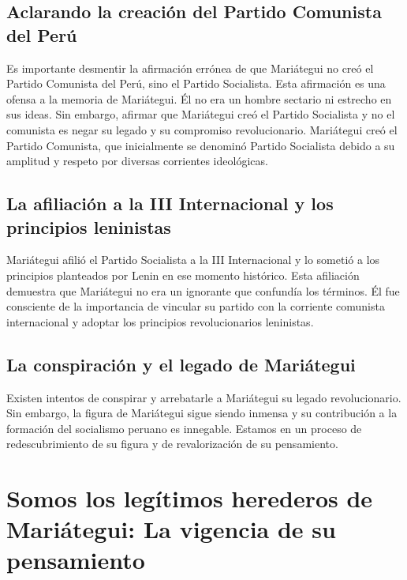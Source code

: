\documentclass[
  a4paper,
]{article}
\begin{document}
\hypertarget{aclarando-la-creaciuxf3n-del-partido-comunista-del-peruxfa}{%
\subsection{Aclarando la creación del Partido Comunista del
Perú}\label{aclarando-la-creaciuxf3n-del-partido-comunista-del-peruxfa}}

Es importante desmentir la afirmación errónea de que Mariátegui no creó
el Partido Comunista del Perú, sino el Partido Socialista. Esta
afirmación es una ofensa a la memoria de Mariátegui. Él no era un hombre
sectario ni estrecho en sus ideas. Sin embargo, afirmar que Mariátegui
creó el Partido Socialista y no el comunista es negar su legado y su
compromiso revolucionario. Mariátegui creó el Partido Comunista, que
inicialmente se denominó Partido Socialista debido a su amplitud y
respeto por diversas corrientes ideológicas.

\hypertarget{la-afiliaciuxf3n-a-la-iii-internacional-y-los-principios-leninistas}{%
\subsection{La afiliación a la III Internacional y los principios
leninistas}\label{la-afiliaciuxf3n-a-la-iii-internacional-y-los-principios-leninistas}}

Mariátegui afilió el Partido Socialista a la III Internacional y lo
sometió a los principios planteados por Lenin en ese momento histórico.
Esta afiliación demuestra que Mariátegui no era un ignorante que
confundía los términos. Él fue consciente de la importancia de vincular
su partido con la corriente comunista internacional y adoptar los
principios revolucionarios leninistas.

\hypertarget{la-conspiraciuxf3n-y-el-legado-de-mariuxe1tegui}{%
\subsection{La conspiración y el legado de
Mariátegui}\label{la-conspiraciuxf3n-y-el-legado-de-mariuxe1tegui}}

Existen intentos de conspirar y arrebatarle a Mariátegui su legado
revolucionario. Sin embargo, la figura de Mariátegui sigue siendo
inmensa y su contribución a la formación del socialismo peruano es
innegable. Estamos en un proceso de redescubrimiento de su figura y de
revalorización de su pensamiento.

\hypertarget{somos-los-leguxedtimos-herederos-de-mariuxe1tegui-la-vigencia-de-su-pensamiento}{%
\section{Somos los legítimos herederos de Mariátegui: La vigencia de su
pensamiento}\label{somos-los-leguxedtimos-herederos-de-mariuxe1tegui-la-vigencia-de-su-pensamiento}}
\end{document}
